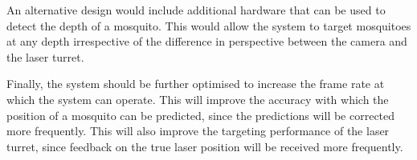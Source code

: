 An alternative design would include additional hardware that can be used to detect the depth of a mosquito. This would allow the system to target mosquitoes at any depth irrespective of the difference in perspective between the camera and the laser turret.

Finally, the system should be further optimised to increase the frame rate at which the system can operate. This will improve the accuracy with which the position of a mosquito can be predicted, since the predictions will be corrected more frequently. This will also improve the targeting performance of the laser turret, since feedback on the true laser position will be received more frequently.
\newpage



